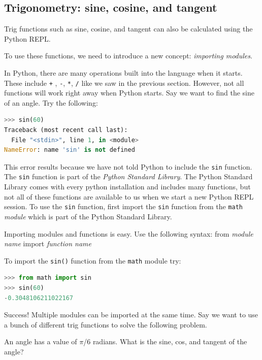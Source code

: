 \documentclass{book}
\begin{document}
    
        \subsection{Trigonometry: sine, cosine, and
tangent}\label{trigonometry-sine-cosine-and-tangent}
    




    
        Trig functions such as sine, cosine, and tangent can also be calculated
using the Python REPL.

To use these functions, we need to introduce a new concept:
\emph{importing modules}.

In Python, there are many operations built into the language when it
starts. These include \lstinline!+! , \lstinline!-!, \lstinline!*!,
\lstinline!/! like we saw in the previous section. However, not all
functions will work right away when Python starts. Say we want to find
the sine of an angle. Try the following:

\begin{lstlisting}[language=Python]
>>> sin(60)
Traceback (most recent call last):
  File "<stdin>", line 1, in <module>
NameError: name 'sin' is not defined
\end{lstlisting}

This error results because we have not told Python to include the
\lstinline!sin! function. The \lstinline!sin! function is part of the
\emph{Python Standard Library}. The Python Standard Library comes with
every python installation and includes many functions, but not all of
these functions are available to us when we start a new Python REPL
session. To use the \lstinline!sin! function, first import the
\lstinline!sin! function from the \lstinline!math! \emph{module} which
is part of the Python Standard Library.

Importing modules and functions is easy. Use the following syntax: from
\emph{module name} import \emph{function name}

To import the \lstinline!sin()! function from the \lstinline!math!
module try:

\begin{lstlisting}[language=Python]
>>> from math import sin
>>> sin(60)
-0.3048106211022167
\end{lstlisting}

Success! Multiple modules can be imported at the same time. Say we want
to use a bunch of different trig functions to solve the following
problem.

An angle has a value of \(\pi\)/6 radians. What is the sine, cos, and
tangent of the angle?
\end{document}
